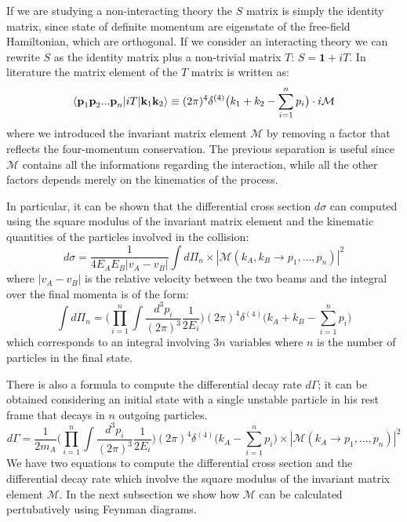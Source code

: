 \documentclass[../main/main.tex]{subfiles}
\begin{document}
If we are studying a non-interacting theory the $S$ matrix is simply the identity matrix, since state of
definite momentum are eigenstate of the free-field Hamiltonian, which are orthogonal. If we consider an interacting theory we can rewrite $S$ as the identity matrix plus a non-trivial matrix $T$: $S = \textbf{1}+ i T$.
\newline
In literature the matrix element of the $T$ matrix is written as:
\begin{equation}
	\label{first matrix element}
	\braket{\textbf{p}_1\textbf{p}_2 ... \textbf{p}_n |i T | \textbf{k}_1 \textbf{k}_2 } \equiv 
	(2 \pi)^4 \delta^{(4)}\big(k_1+k_2- \sum_{i=1}^n p_i\big) \cdot i \mathcal{M}
\end{equation}
where we introduced the invariant matrix element $\mathcal{M}$ by removing a factor that reflects the four-momentum conservation.
The previous separation is useful since $\mathcal{M}$ contains all the informations regarding the interaction, while all the other factors depends merely on the kinematics of the process.

In particular, it can be shown that the differential cross section $d\sigma$ can computed using the square modulus of the invariant 
matrix element and the kinematic quantities of the particles involved in the collision:
\begin{equation}
	\label{sigma}
	d \sigma = \frac{1}{4 E_A E_B |v_A - v_B|} \int d\Pi_n \times |\mathcal{M}(k_A, k_B \to p_1, ..., p_n)|^2
\end{equation}
where $ |v_A - v_B|$ is the relative velocity between the two beams and the integral over the final momenta is of the form:
\begin{equation}
	\int d\Pi_n  = \bigg( \prod_{i=1}^{n}\int
	\frac{d^3 p_i}{(2 \pi)^3}
	\frac{1}{2 E_i} \bigg) (2\pi)^4 \delta^{(4)}\big(k_A+ k_B- \sum_{i=1}^n p_i\big)
\end{equation} 
which corresponds to an integral involving $3n$ variables where $n$ is the number of particles in the final state.

There is also a formula to compute the differential decay rate $d\Gamma$; it can be obtained considering an initial state with a single
unstable particle in his rest frame that decays in $n$ outgoing particles.
\begin{equation}
	d\Gamma = \frac{1}{2 m_A} \bigg( \prod_{i=1}^{n}\int
	\frac{d^3 p_i}{(2 \pi)^3}
	\frac{1}{2 E_i} \bigg) (2\pi)^4 \delta^{(4)}\big(k_A- \sum_{i=1}^n p_i\big) \times |\mathcal{M}(k_A \to p_1, ..., p_n)|^2
\end{equation}
We have two equations to compute the differential cross section and the differential decay rate which involve the square modulus of 
the invariant matrix element $\mathcal{M}$. In the next subsection we show how $\mathcal{M}$ can be calculated pertubatively using Feynman diagrams.
\end{document}
